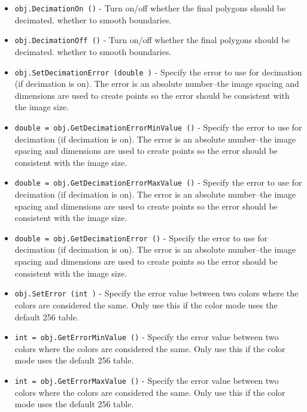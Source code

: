 \begin{itemize}
\item  \verb|obj.DecimationOn ()| -  Turn on/off whether the final polygons should be decimated.
 whether to smooth boundaries.

\item  \verb|obj.DecimationOff ()| -  Turn on/off whether the final polygons should be decimated.
 whether to smooth boundaries.

\item  \verb|obj.SetDecimationError (double )| -  Specify the error to use for decimation (if decimation is on).
 The error is an absolute number--the image spacing and
 dimensions are used to create points so the error should be
 consistent with the image size.

\item  \verb|double = obj.GetDecimationErrorMinValue ()| -  Specify the error to use for decimation (if decimation is on).
 The error is an absolute number--the image spacing and
 dimensions are used to create points so the error should be
 consistent with the image size.

\item  \verb|double = obj.GetDecimationErrorMaxValue ()| -  Specify the error to use for decimation (if decimation is on).
 The error is an absolute number--the image spacing and
 dimensions are used to create points so the error should be
 consistent with the image size.

\item  \verb|double = obj.GetDecimationError ()| -  Specify the error to use for decimation (if decimation is on).
 The error is an absolute number--the image spacing and
 dimensions are used to create points so the error should be
 consistent with the image size.

\item  \verb|obj.SetError (int )| -  Specify the error value between two colors where the colors are 
 considered the same. Only use this if the color mode uses the
 default 256 table.

\item  \verb|int = obj.GetErrorMinValue ()| -  Specify the error value between two colors where the colors are 
 considered the same. Only use this if the color mode uses the
 default 256 table.

\item  \verb|int = obj.GetErrorMaxValue ()| -  Specify the error value between two colors where the colors are 
 considered the same. Only use this if the color mode uses the
 default 256 table.


\end{itemize}
